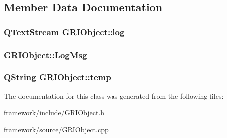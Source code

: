 \subsection{\-Member \-Data \-Documentation}
\hypertarget{classGRIObject_a891c066215aedc6f77892bd6912c4006}{
\subsubsection[{log}]{\setlength{\rightskip}{0pt plus 5cm}\-Q\-Text\-Stream {\bf \-G\-R\-I\-Object\-::log}}}\label{classGRIObject_a891c066215aedc6f77892bd6912c4006}
\hypertarget{classGRIObject_a3ca5b2d0ee8551d1cf9f7c90427f4c0c}{
\subsubsection[{\-Log\-Msg}]{ {\bf \-G\-R\-I\-Object\-::\-Log\-Msg}}}\label{classGRIObject_a3ca5b2d0ee8551d1cf9f7c90427f4c0c}
\hypertarget{classGRIObject_acbbf1ed13f0bb4da42a4c1f601d2a9a0}{
\subsubsection[{temp}]{\setlength{\rightskip}{0pt plus 5cm}\-Q\-String {\bf \-G\-R\-I\-Object\-::temp}}}\label{classGRIObject_acbbf1ed13f0bb4da42a4c1f601d2a9a0}


\-The documentation for this class was generated from the following files\-:\begin{DoxyCompactItemize}
\item 
framework/include/\hyperlink{GRIObject_8h}{\-G\-R\-I\-Object.\-h}\item 
framework/source/\hyperlink{GRIObject_8cpp}{\-G\-R\-I\-Object.\-cpp}\end{DoxyCompactItemize}
